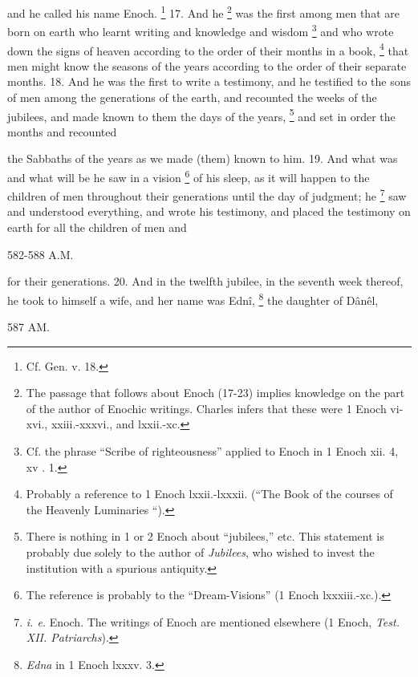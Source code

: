 and he called his name Enoch. \footnote{Cf. Gen. v. 18.} 17. And he \footnote{The passage that follows about Enoch (17-23) implies knowledge on the part of the author of Enochic writings. Charles infers that these were 1 Enoch vi-xvi., xxiii.-xxxvi., and lxxii.-xc.} was the first among men that are born on earth who learnt writing and knowledge and wisdom \footnote{Cf. the phrase ``Scribe of righteousness'' applied to Enoch in 1 Enoch xii. 4, xv . 1.} and who wrote down the signs of heaven according to the order of their months in a book, \footnote{Probably a reference to 1 Enoch lxxii.-lxxxii. (``The Book of the courses of the Heavenly Luminaries ``).} that men might know the seasons of the years according to the order of their separate months. 18. And he was the first to write a testimony, and he testified to the sons of men among the generations of the earth, and recounted the weeks of the jubilees, and made known to them the days of the years, \footnote{There is nothing in 1 or 2 Enoch about ``jubilees,'' etc. This statement is probably due solely to the author of \emph{Jubilees}, who wished to invest the institution with a spurious antiquity.} and set in order the months and recounted

the Sabbaths of the years as we made (them) known to him. 19. And what was and what will be he saw in a vision \footnote{The reference is probably to the ``Dream-Visions'' (1 Enoch lxxxiii.-xc.).} of his sleep, as it will happen to the children of men throughout their generations until the day of judgment; he \footnote{\emph{i. e.} Enoch. The writings of Enoch are mentioned elsewhere (1 Enoch, \emph{Test. XII. Patriarchs}).} saw and understood everything, and wrote his testimony, and placed the testimony on earth for all the children of men and

582-588 A.M.

for their generations. 20. And in the twelfth jubilee, in the seventh week thereof, he took to himself a wife, and her name was Ednî, \footnote{\emph{Edna} in 1 Enoch lxxxv. 3.} the daughter of Dânêl,

587 AM.

